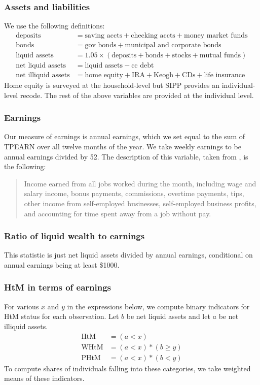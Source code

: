 \documentclass{article}
\begin{document}
\subsubsection{Assets and liabilities}
We use the following definitions:
\begin{align*}
\text{deposits} &= \text{saving accts} + \text{checking accts} + \text{money market funds} \\
\text{bonds} &= \text{gov bonds} + \text{municipal and corporate bonds} \\
\text{liquid assets} &= 1.05 \times (\text{deposits} + \text{bonds} + \text{stocks} + \text{mutual funds}) \\
\text{net liquid assets} &= \text{liquid assets} - \text{cc debt} \\
\text{net illiquid assets} &= \text{home equity} + \text{IRA} + \text{Keogh} + \text{CDs} + \text{life insurance}
\end{align*}
Home equity is surveyed at the household-level but SIPP provides an individual-level recode. The rest of the above variables are provided at the individual level.

\subsubsection{Earnings}
Our measure of earnings is annual earnings, which we set equal to the sum of TPEARN over all twelve months of the year. We take weekly earnings to be annual earnings divided by 52. The description of this variable, taken from \cite{tpearn}, is the following:
\begin{quote}
Income earned from all jobs worked during the month, including wage and salary income, bonus payments, commissions, overtime payments, tips, other income from self-employed businesses, self-employed business profits, and accounting for time spent away from a job without pay.
\end{quote}

\subsubsection{Ratio of liquid wealth to earnings}
This statistic is just net liquid assets divided by annual earnings, conditional on annual earnings being at least \$1000.

\subsubsection{HtM in terms of earnings}
For various $x$ and $y$ in the expressions below, we compute binary indicators for HtM status for each observation. Let $b$ be net liquid assets and let $a$ be net illiquid assets.
\begin{align*}
\text{HtM} &= (a < x) \\
\text{WHtM} &= (a < x) * (b \geq y) \\
\text{PHtM} &= (a < x) * (b < y)
\end{align*}
To compute shares of individuals falling into these categories, we take weighted means of these indicators.
\end{document}
